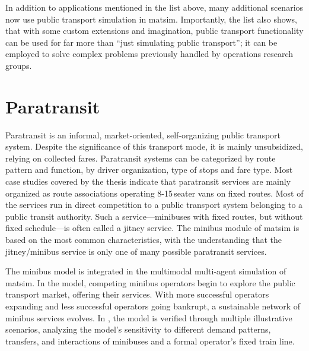 In addition to applications mentioned in the list above, many additional scenarios now
use public transport simulation in \gls{matsim}. Importantly, the list also
shows, that with some custom extensions and imagination, public transport
functionality can be used for far more than ``just simulating public transport''; it can be
employed to solve complex problems previously handled by operations research
groups.

\section{Paratransit}
\label{sec:paratransit}
Paratransit is an informal, market-oriented, self-organizing public transport system. 
Despite the significance of this transport mode, it is mainly unsubsidized, relying on collected fares. 
Paratransit systems can be categorized by route pattern and function, by driver organization, type of stops and fare type. 
Most case studies covered by the \citet[][]{Neumann2014PhD} thesis indicate that paratransit services are mainly 
organized as route associations operating 8-15\,seater vans on fixed routes. Most of the services run in direct competition to a
public transport system belonging to a public transit authority. Such a service---minibuses with fixed routes, but without fixed schedule---is often called a jitney service.
The minibus module of \gls{matsim} is based on the most common characteristics, with the understanding that the jitney/minibus
service is only one of many possible paratransit services.

The minibus model is integrated in the \gls{multimodal} multi-agent simulation of \gls{matsim}. In the model, competing minibus operators begin to explore the public transport market, offering their services. With more successful operators expanding and less successful operators going bankrupt, a sustainable network of minibus services evolves. In \citet[][]{Neumann2014PhD}, the model is verified through multiple illustrative scenarios, analyzing the model's sensitivity to different demand patterns, transfers, and interactions of minibuses and a formal operator's fixed train line.

